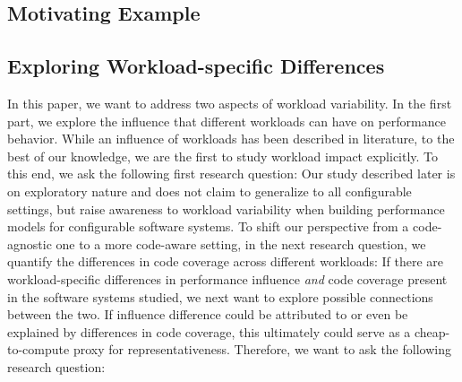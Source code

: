 \subsection{Motivating Example}
\blindtext
\begin{comment}56
\begin{lstlisting}[caption={Illustrative code example with one configuration option (\texttt{CACHING}) and workload-specific behavior.},label=lst:bener, language=Python]
CACHING = parse_options()

def calc_word_frequency(self, path: String)
	workload = open(path, 'r').read()
	workload_size = len(workload)
	frequencies = dict()

	# option-dependent
	if CACHING and path in self.cache:
		return self.cache[path]
		
	# workload-dependent
	if workload_size > 1024:	
		for word in workload.split(' '):
			if word not in frequencies: 
				frequencies[word] = 0
			frequencies[word] += 1
	
	# option- and workload-dependent
	if CACHING and workload_size > 65536:
		self.cache[path] = frequencies
					
	return frequencies
\end{lstlisting}
\end{comment}

\subsection{Exploring Workload-specific Differences}

In this paper, we want to address two aspects of workload variability. In the first part, we explore the influence that different workloads can have on performance behavior. While an influence of workloads has been described in literature, to the best of our knowledge, we are the first to study workload impact explicitly. To this end, we ask the following first research question:
Our study described later is on exploratory nature and does not claim to generalize to all configurable settings, but raise awareness to workload variability when building performance models for configurable software systems. 
To shift our perspective from a code-agnostic one to a more code-aware setting, in the next research question, we quantify the differences in code coverage across different workloads:
If there are workload-specific differences in performance influence \emph{and} code coverage present in the software systems studied, we next want to explore possible connections between the two. If influence difference could be attributed to or even be explained by differences in code coverage, this ultimately could serve as a cheap-to-compute proxy for representativeness. Therefore, we want to ask the following research question:

